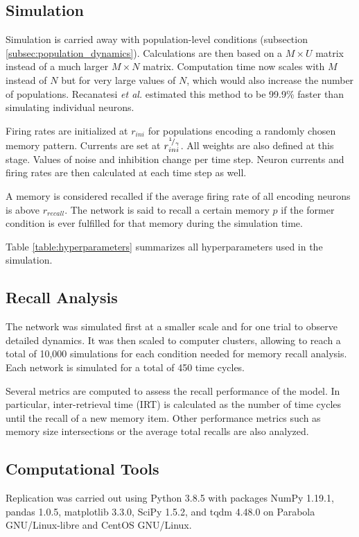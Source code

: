 \subsection{Simulation}

Simulation is carried away with population-level conditions (subsection \ref{subsec:population_dynamics}).
Calculations are then based on a \(M \times U\) matrix instead of a much larger \(M \times N\) matrix.
Computation time now scales with \(M\) instead of \(N\) but for very large values of \(N\), which would also increase the number of populations.
Recanatesi \textit{et al.} \parencite{recanatesi2015} estimated this method to be 99.9\% faster than simulating individual neurons.

Firing rates are initialized at \(r_{ini}\) for populations encoding a randomly chosen memory pattern.
Currents are set at \(r_{ini}^{{}^{1}\!/_{\gamma}}\).
All weights are also defined at this stage.
Values of noise and inhibition change per time step.
Neuron currents and firing rates are then calculated at each time step as well.

A memory is considered recalled if the average firing rate of all encoding neurons is above \(r_{recall}\).
The network is said to recall a certain memory \(p\) if the former condition is ever fulfilled for that memory during the simulation time.

Table \ref{table:hyperparameters} summarizes all hyperparameters used in the simulation.

\subsection{Recall Analysis}

The network was simulated first at a smaller scale and for one trial to observe detailed dynamics.
It was then scaled to computer clusters, allowing to reach a total of 10,000 simulations for each condition needed for memory recall analysis.
Each network is simulated for a total of 450 time cycles.

Several metrics are computed to assess the recall performance of the model.
In particular, inter-retrieval time (IRT) is calculated as the number of time cycles until the recall of a new memory item.
Other performance metrics such as memory size intersections or the average total recalls are also analyzed.

\subsection{Computational Tools}

Replication was carried out using Python 3.8.5 with packages NumPy 1.19.1, pandas 1.0.5, matplotlib 3.3.0, SciPy 1.5.2, and tqdm 4.48.0 on Parabola GNU/Linux-libre and CentOS GNU/Linux.